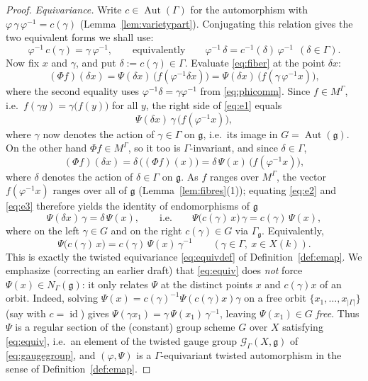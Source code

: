 \documentclass{amsart}
\theoremstyle{definition}
\DeclareMathOperator{\Aut}{Aut}
\DeclareMathOperator{\id}{id}
\newcommand{\g}{\mathfrak{g}}
\newcommand{\M}{M}
\begin{document}
\begin{proof}
\emph{Equivariance.}  Write $c\in\Aut(\Gamma)$ for the automorphism with
$\varphi\,\gamma\,\varphi^{-1}=c(\gamma)$ (Lemma~\ref{lem:varietypart}).
Conjugating this relation gives the two equivalent forms we shall use:
\begin{equation}\label{eq:phicomm}
\varphi^{-1}\,c(\gamma)=\gamma\,\varphi^{-1},
\qquad\text{equivalently}\qquad
\varphi^{-1}\,\delta=c^{-1}(\delta)\,\varphi^{-1}\ \ (\delta\in\Gamma).
\end{equation}
Now fix $x$ and $\gamma$, and put $\delta:=c(\gamma)\in\Gamma$.  Evaluate
\eqref{eq:fiber} at the point $\delta x$:
\begin{equation}\label{eq:e1}
(\Phi f)(\delta x)=\Psi(\delta x)\,\bigl(f(\varphi^{-1}\delta x)\bigr)
=\Psi(\delta x)\,\bigl(f(\gamma\,\varphi^{-1}x)\bigr),
\end{equation}
where the second equality uses $\varphi^{-1}\delta=\gamma\varphi^{-1}$ from
\eqref{eq:phicomm}.  Since $f\in\M^\Gamma$, i.e.\ $f(\gamma y)=
\gamma\bigl(f(y)\bigr)$ for all $y$, the right side of \eqref{eq:e1}
equals
\begin{equation}\label{eq:e2}
\Psi(\delta x)\,\gamma\,\bigl(f(\varphi^{-1}x)\bigr),
\end{equation}
where $\gamma$ now denotes the action of $\gamma\in\Gamma$ on $\g$, i.e.\
its image in $G=\Aut(\g)$.  On the other hand $\Phi f\in\M^\Gamma$, so it
too is $\Gamma$-invariant, and since $\delta\in\Gamma$,
\begin{equation}\label{eq:e3}
(\Phi f)(\delta x)=\delta\,\bigl((\Phi f)(x)\bigr)
=\delta\,\Psi(x)\,\bigl(f(\varphi^{-1}x)\bigr),
\end{equation}
where $\delta$ denotes the action of $\delta\in\Gamma$ on $\g$.  As $f$
ranges over $\M^\Gamma$, the vector $f(\varphi^{-1}x)$ ranges over all of
$\g$ (Lemma~\ref{lem:fibres}(1)); equating \eqref{eq:e2} and \eqref{eq:e3}
therefore yields the identity of endomorphisms of $\g$
\[
\Psi(\delta x)\,\gamma=\delta\,\Psi(x),
\qquad\text{i.e.}\qquad
\Psi\bigl(c(\gamma)\,x\bigr)\,\gamma=c(\gamma)\,\Psi(x),
\]
where on the left $\gamma\in G$ and on the right $c(\gamma)\in G$ via
$\Gamma_\g$.  Equivalently,
\begin{equation}\label{eq:equiv}
\Psi\bigl(c(\gamma)\,x\bigr)=c(\gamma)\,\Psi(x)\,\gamma^{-1}\qquad
(\gamma\in\Gamma,\ x\in X(k)).
\end{equation}
This is exactly the twisted equivariance \eqref{eq:equivdef} of
Definition~\ref{def:emap}.  We emphasize (correcting an earlier draft) that
\eqref{eq:equiv} does \emph{not} force $\Psi(x)\in N_\Gamma(\g)$: it only
relates $\Psi$ at the distinct points $x$ and $c(\gamma)x$ of an orbit.
Indeed, solving $\Psi(x)=c(\gamma)^{-1}\Psi(c(\gamma)x)\gamma$ on a free
orbit $\{x_1,\dots,x_{|\Gamma|}\}$ (say with $c=\id$) gives
$\Psi(\gamma x_1)=\gamma\,\Psi(x_1)\,\gamma^{-1}$, leaving $\Psi(x_1)\in G$
\emph{free}.  Thus $\Psi$ is a regular section of the (constant) group
scheme $G$ over $X$ satisfying \eqref{eq:equiv}, i.e.\ an element of the
twisted gauge group $\mathcal G_\Gamma(X,\g)$ of \eqref{eq:gaugegroup}, and
$(\varphi,\Psi)$ is a $\Gamma$-equivariant twisted automorphism in the
sense of Definition~\ref{def:emap}.
\end{proof}
\end{document}
